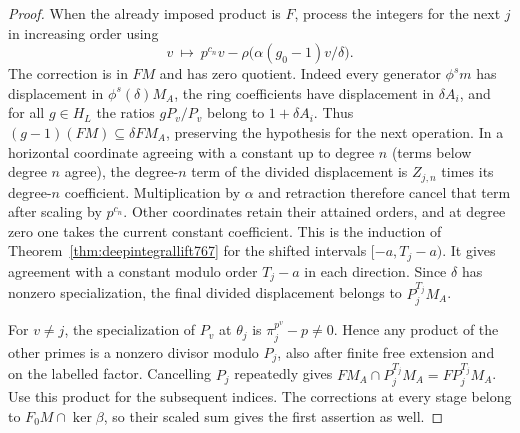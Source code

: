 \documentclass[a4paper,11pt]{article}
\theoremstyle{definition}
\theoremstyle{remark}
\numberwithin{equation}{section}
\begin{document}
\begin{proof}
When the already imposed product is \(F\), process the
integers for the next \(j\) in increasing order using
\[
             v\ \longmapsto\ p^{c_n}v-
                   \rho\big(\alpha(g_0-1)v/\delta\big).
\]
The correction is in \(FM\) and has zero quotient.
Indeed every generator \(\phi^s m\) has displacement
in \(\phi^s(\delta)M_A\), the ring coefficients have
displacement in \(\delta A_i\), and for all \(g\in H_L\)
the ratios \(gP_v/P_v\) belong to \(1+\delta A_i\).
Thus \((g-1)(FM)\subseteq\delta FM_A\), preserving the
hypothesis for the next operation. In a horizontal
coordinate agreeing with a constant up to degree \(n\)
(terms below degree \(n\) agree), the degree-\(n\) term
of the divided displacement is \(Z_{j,n}\) times its
degree-\(n\) coefficient. Multiplication by \(\alpha\)
and retraction therefore cancel that term after scaling
by \(p^{c_n}\). Other coordinates retain their attained
orders, and at degree zero one takes the current constant
coefficient. This is the induction of
Theorem~\ref{thm:deepintegrallift767} for the shifted
intervals \([-a,T_j-a)\). It gives agreement with a
constant modulo order \(T_j-a\) in each direction.
Since \(\delta\) has nonzero specialization, the final
divided displacement belongs to \(P_j^{T_j}M_A\).

For \(v\ne j\), the specialization of \(P_v\) at
\(\theta_j\) is \(\pi_j^{p^v}-p\ne0\). Hence any product
of the other primes is a nonzero divisor modulo \(P_j\),
also after finite free extension and on the labelled
factor. Cancelling \(P_j\) repeatedly gives
\(FM_A\cap P_j^{T_j}M_A=FP_j^{T_j}M_A\).
Use this product for the subsequent indices. The
corrections at every stage belong to \(F_0M\cap\ker\beta\),
so their scaled sum gives the first assertion as well.
\end{proof}
\end{document}
